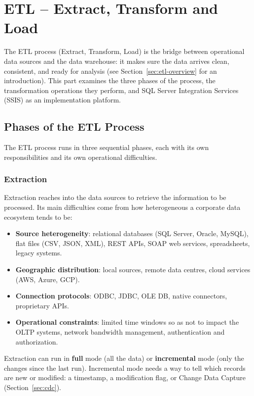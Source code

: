 
\section{ETL -- Extract, Transform and Load}
\label{part:etl-ssis}

The ETL process (Extract, Transform, Load) is the bridge between operational data sources and the data warehouse: it makes sure the data arrives clean, consistent, and ready for analysis (see Section~\ref{sec:etl-overview} for an introduction). This part examines the three phases of the process, the transformation operations they perform, and SQL Server Integration Services (SSIS) as an implementation platform.

\subsection{Phases of the ETL Process}
\label{sec:etl-phases}

The ETL process runs in three sequential phases, each with its own responsibilities and its own operational difficulties.

\subsubsection{Extraction}
\label{subsec:extraction-phase}

Extraction reaches into the data sources to retrieve the information to be processed. Its main difficulties come from how heterogeneous a corporate data ecosystem tends to be:

\begin{itemize}
    \item \textbf{Source heterogeneity}: relational databases (SQL Server, Oracle, MySQL), flat files (CSV, JSON, XML), REST APIs, SOAP web services, spreadsheets, legacy systems.
    \item \textbf{Geographic distribution}: local sources, remote data centres, cloud services (AWS, Azure, GCP).
    \item \textbf{Connection protocols}: ODBC, JDBC, OLE DB, native connectors, proprietary APIs.
    \item \textbf{Operational constraints}: limited time windows so as not to impact the OLTP systems, network bandwidth management, authentication and authorization.
\end{itemize}

Extraction can run in \textbf{full} mode (all the data) or \textbf{incremental} mode (only the changes since the last run). Incremental mode needs a way to tell which records are new or modified: a timestamp, a modification flag, or Change Data Capture (Section~\ref{sec:cdc}).

